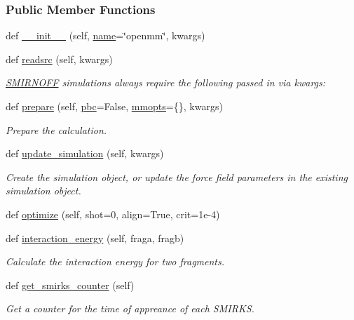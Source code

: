 \subsubsection*{Public Member Functions}
\begin{DoxyCompactItemize}
\item 
def \hyperlink{classsrc_1_1smirnoffio_1_1SMIRNOFF_aafab5a9cbe68264712637919eaa4c191}{\+\_\+\+\_\+init\+\_\+\+\_\+} (self, \hyperlink{classsrc_1_1smirnoffio_1_1SMIRNOFF_a11542ad6ce7fca3d8e201d3977bf8379}{name}=\char`\"{}openmm\char`\"{}, kwargs)
\item 
def \hyperlink{classsrc_1_1smirnoffio_1_1SMIRNOFF_a3429bb5ae44273ea911ce3889df8990e}{readsrc} (self, kwargs)
\begin{DoxyCompactList}\small\item\em \hyperlink{classsrc_1_1smirnoffio_1_1SMIRNOFF}{S\+M\+I\+R\+N\+O\+FF} simulations always require the following passed in via kwargs\+: \end{DoxyCompactList}\item 
def \hyperlink{classsrc_1_1smirnoffio_1_1SMIRNOFF_aec97b6c7793cb75a0c653e5e2b393799}{prepare} (self, \hyperlink{classsrc_1_1smirnoffio_1_1SMIRNOFF_a10129110be75721cbb8fb7b612dc8468}{pbc}=False, \hyperlink{classsrc_1_1smirnoffio_1_1SMIRNOFF_ac24dace8bbb369246c19f85dfc4b5b92}{mmopts}=\{\}, kwargs)
\begin{DoxyCompactList}\small\item\em Prepare the calculation. \end{DoxyCompactList}\item 
def \hyperlink{classsrc_1_1smirnoffio_1_1SMIRNOFF_a73f2a7957b55c4ee6c63a7c1c185c528}{update\+\_\+simulation} (self, kwargs)
\begin{DoxyCompactList}\small\item\em Create the simulation object, or update the force field parameters in the existing simulation object. \end{DoxyCompactList}\item 
def \hyperlink{classsrc_1_1smirnoffio_1_1SMIRNOFF_aae8b084d595c6779e535519abf4718c2}{optimize} (self, shot=0, align=True, crit=1e-\/4)
\item 
def \hyperlink{classsrc_1_1smirnoffio_1_1SMIRNOFF_a64a07cbc61134660c4c6d97337b1e785}{interaction\+\_\+energy} (self, fraga, fragb)
\begin{DoxyCompactList}\small\item\em Calculate the interaction energy for two fragments. \end{DoxyCompactList}\item 
def \hyperlink{classsrc_1_1smirnoffio_1_1SMIRNOFF_a328bfae882bfe603e397ebe74a2455e9}{get\+\_\+smirks\+\_\+counter} (self)
\begin{DoxyCompactList}\small\item\em Get a counter for the time of appreance of each S\+M\+I\+R\+KS. \end{DoxyCompactList}\end{DoxyCompactItemize}
